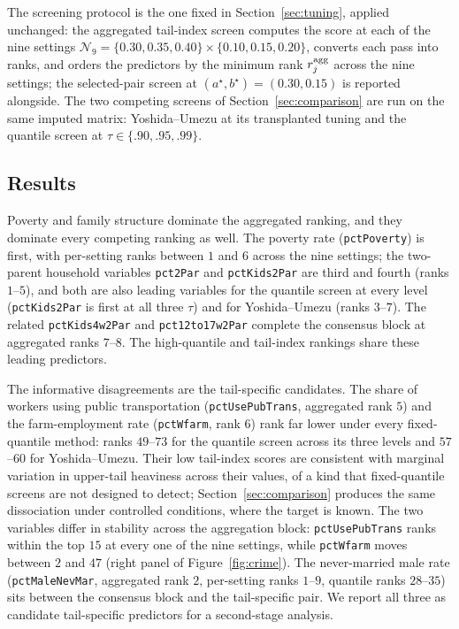 The screening protocol is the one fixed in Section~\ref{sec:tuning},
applied unchanged: the aggregated tail-index screen computes the score
at each of the nine settings
$\mathcal N_9=\{0.30,0.35,0.40\}\times\{0.10,0.15,0.20\}$, converts
each pass into ranks, and orders the predictors by the minimum rank
$r_j^{\rm agg}$ across the nine settings; the selected-pair screen at
$(a^\star,b^\star)=(0.30,0.15)$ is reported alongside. The two
competing screens of Section~\ref{sec:comparison} are run on the same
imputed matrix: Yoshida--Umezu at its transplanted tuning and the
quantile screen at $\tau\in\{.90,.95,.99\}$.

\subsection{Results}

Poverty and family structure dominate the aggregated ranking, and they
dominate every competing ranking as well. The poverty rate
(\texttt{pctPoverty}) is first, with per-setting ranks between $1$ and
$6$ across the nine settings; the two-parent household variables
\texttt{pct2Par} and \texttt{pctKids2Par} are third and fourth (ranks
$1$--$5$), and both are also leading variables for the quantile screen
at every level (\texttt{pctKids2Par} is first at all three $\tau$)
and for Yoshida--Umezu (ranks $3$--$7$). The related
\texttt{pctKids4w2Par} and \texttt{pct12to17w2Par} complete the
consensus block at aggregated ranks $7$--$8$. The high-quantile and
tail-index rankings share these leading predictors.

The informative disagreements are the tail-specific candidates. The
share of workers using public transportation
(\texttt{pctUsePubTrans}, aggregated rank $5$) and the farm-employment
rate (\texttt{pctWfarm}, rank $6$) rank far lower under every
fixed-quantile method: ranks $49$--$73$ for the quantile screen across
its three levels and $57$--$60$ for Yoshida--Umezu. Their low
tail-index scores are consistent with marginal variation in upper-tail
heaviness across their values, of a kind that fixed-quantile screens are
not designed to detect; Section~\ref{sec:comparison} produces the same
dissociation under controlled conditions, where the target is known.
The two variables differ in stability across the aggregation block:
\texttt{pctUsePubTrans} ranks within the top $15$ at every one of the
nine settings, while \texttt{pctWfarm} moves between $2$ and $47$
(right panel of Figure~\ref{fig:crime}). The never-married male rate
(\texttt{pctMaleNevMar}, aggregated rank $2$, per-setting ranks
$1$--$9$, quantile ranks $28$--$35$) sits between the consensus block
and the tail-specific pair. We report all three as candidate
tail-specific predictors for a second-stage analysis.

